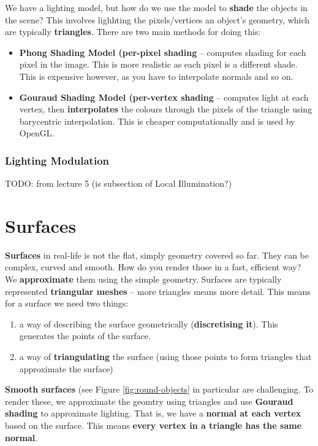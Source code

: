 \documentclass{article}
\begin{document}
We have a lighting model, but how do we use the model to \textbf{shade} the objects in the scene? This involves lighhting the pixels/vertices an object's geometry, which are typically \textbf{triangles}. There are two main methods for doing this:
\begin{itemize}
	\item \textbf{Phong Shading Model (per-pixel shading} -- computes shading for each pixel in the image. This is more realistic as each pixel is a different shade. This is expensive however, as you have to interpolate normals and so on.
	\item \textbf{Gouraud Shading Model  (per-vertex shading} -- computes light at each vertex, then \textbf{interpolates} the colours through the pixels of the triangle using barycentric interpolation. This is cheaper computationally and is used by OpenGL.
\end{itemize}

\subsubsection{Lighting Modulation}

TODO: from lecture 5 (is subsection of Local Illumination?)

\section{Surfaces}

\textbf{Surfaces} in real-life is not the flat, simply geometry covered so far. They can be complex, curved and smooth. How do you render those in a fast, efficient way? We \textbf{approximate} them using the simple geometry. Surfaces are typically represented  \textbf{triangular meshes} -- more triangles means more detail. This means for a surface we need two things:
\begin{enumerate}
	\item a way of describing the surface geometrically (\textbf{discretising it}). This generates the points of the surface.
	\item a way of \textbf{triangulating} the surface (using those points to form triangles that approximate the surface)
\end{enumerate}

\textbf{Smooth surfaces} (see Figure \ref{fig:round-objects} in particular are challenging. To render these, we approximate the geomtry using triangles and use \textbf{Gouraud shading} to approximate lighting. That is, we have a \textbf{normal at each vertex} based on the surface. This means \textbf{every vertex in a triangle has the same normal}.
\end{document}
